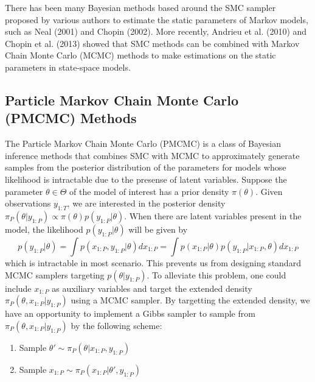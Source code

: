 \documentclass[12pt,a4paper]{article}
\begin{document}
There has been many Bayesian methods based around the SMC sampler proposed by various authors to estimate the static parameters of Markov models, such as Neal (2001) and Chopin (2002). More recently, Andrieu et al. (2010) and Chopin et al. (2013) showed that SMC methods can be combined with Markov Chain Monte Carlo (MCMC) methods to make estimations on the static parameters in state-space models. 
\subsection{Particle Markov Chain Monte Carlo (PMCMC) Methods }
The Particle Markov Chain Monte Carlo (PMCMC) is a class of Bayesian inference methods that combines SMC with MCMC to approximately generate samples from the posterior distribution of the parameters for models whose likelihood is intractable due to the presense of latent variables. Suppose the parameter $\theta \in \Theta$ of the model of interest has a prior density $\pi(\theta)$. Given observations $y_{1:T}$, we are interested in the posterior density $\pi_P(\theta|y_{1:P}) \propto \pi(\theta)p(y_{1:P}|\theta)$. When there are latent variables present in the model, the likelihood $p(y_{1:P}|\theta)$ will be given by 
\begin{equation}
    \label{PMCMC-marginal likelihood}
    p(y_{1:P}|\theta) = \int p(x_{1:P},y_{1:P}|\theta)dx_{1:P} = \int p(x_{1:P}|\theta) p(y_{1:P}|x_{1:P},\theta) dx_{1:P}
\end{equation}
which is intractable in most scenario. This prevents us from designing standard MCMC samplers targeting $p(\theta|y_{1:P})$. To alleviate this problem, one could include $x_{1:P}$ as auxiliary variables and target the extended density $\pi_P(\theta,x_{1:P}|y_{1:P})$ using a MCMC sampler. By targetting the extended density, we have an opportunity to implement a Gibbs sampler to sample from $\pi_P(\theta,x_{1:P}|y_{1:P})$ by the following scheme:
\begin{enumerate}[label=\textit{Step \arabic*.},leftmargin=*]
    \item Sample $\theta' \sim \pi_P(\theta|x_{1:P},y_{1:P})$
    \item Sample $x_{1:P} \sim \pi_P(x_{1:P}|\theta',y_{1:P})$
\end{enumerate}
\end{document}
